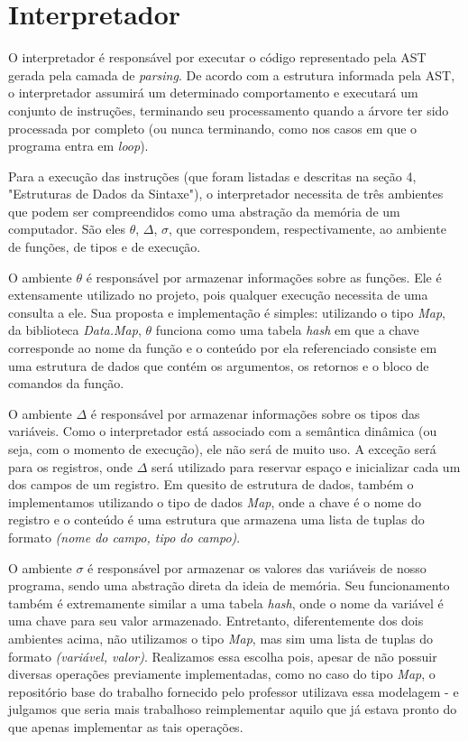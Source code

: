 \documentclass{article}
\begin{document}
\section{Interpretador}
O interpretador é responsável por executar o código representado pela AST gerada pela camada de \textit{parsing}. De acordo com a estrutura informada pela AST, o interpretador assumirá um determinado comportamento e executará um conjunto de instruções, terminando seu processamento quando a árvore ter sido processada por completo (ou nunca terminando, como nos casos em que o programa entra em \textit{loop}).

Para a execução das instruções (que foram listadas e descritas na seção 4, "Estruturas de Dados da Sintaxe"), o interpretador necessita de três ambientes que podem ser compreendidos como uma abstração da memória de um computador. São eles $\theta$, $\Delta$, $\sigma$, que correspondem, respectivamente, ao ambiente de funções, de tipos e de execução.

O ambiente $\theta$ é responsável por armazenar informações sobre as funções. Ele é extensamente utilizado no projeto, pois qualquer execução necessita de uma consulta a ele. Sua proposta e implementação é simples: utilizando o tipo \textit{Map}, da biblioteca \textit{Data.Map}, $\theta$ funciona como uma tabela \textit{hash} em que a chave corresponde ao nome da função e o conteúdo por ela referenciado consiste em uma estrutura de dados que contém os argumentos, os retornos e o bloco de comandos da função.

O ambiente $\Delta$ é responsável por armazenar informações sobre os tipos das variáveis. Como o interpretador está associado com a semântica dinâmica (ou seja, com o momento de execução), ele não será de muito uso. A exceção será para os registros, onde $\Delta$ será utilizado para reservar espaço e inicializar cada um dos campos de um registro. Em quesito de estrutura de dados, também o implementamos utilizando o tipo de dados \textit{Map}, onde a chave é o nome do registro e o conteúdo é uma estrutura que armazena uma lista de tuplas do formato \textit{(nome do campo, tipo do campo)}.

O ambiente $\sigma$ é responsável por armazenar os valores das variáveis de nosso programa, sendo uma abstração direta da ideia de memória. Seu funcionamento também é extremamente similar a uma tabela \textit{hash}, onde o nome da variável é uma chave para seu valor armazenado. Entretanto, diferentemente dos dois ambientes acima, não utilizamos o tipo \textit{Map}, mas sim uma lista de tuplas do formato \textit{(variável, valor)}. Realizamos essa escolha pois, apesar de não possuir diversas operações previamente implementadas, como no caso do tipo \textit{Map}, o repositório base do trabalho fornecido pelo professor utilizava essa modelagem - e julgamos que seria mais trabalhoso reimplementar aquilo que já estava pronto do que apenas implementar as tais operações.
\end{document}
